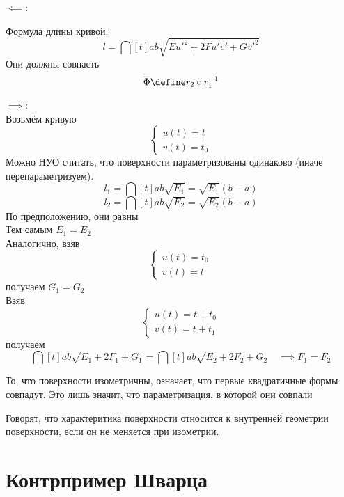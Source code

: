 \begin{iproof}
	\item $ \impliedby $:

	Формула длины кривой:
	$$ l = \dint[t]{a}b{\sqrt{Eu'^2 + 2Fu'v' + Gv'^2}} $$
	Они должны совпасть
	$$ \ol{\Phi} \define r_2 \circ r_1^{-1} $$
	\item $ \implies $: \\
	Возьмём кривую
	$$
	\begin{cases}
		u(t) = t \\
		v(t) = t_0
	\end{cases} $$
	Можно НУО считать, что поверхности параметризованы одинаково (иначе перепараметризуем).
	$$ l_1 = \dint[t]{a}b{\sqrt{E_1}} = \sqrt{E_1}(b - a) $$
	$$ l_2 = \dint[t]{a}b{\sqrt{E_2}} = \sqrt{E_2}(b - a) $$
	По предположению, они равны \\
	Тем самым $ E_1 = E_2 $ \\
	Аналогично, взяв
	$$
	\begin{cases}
		u(t) = t_0 \\
		v(t) = t
	\end{cases} $$
	получаем $ G_1 = G_2 $ \\
	Взяв
	$$
	\begin{cases}
		u(t) = t + t_0 \\
		v(t) = t + t_1
	\end{cases} $$
	получаем
	$$ \dint[t]{a}b{\sqrt{E_1 + 2F_1 + G_1}} = \dint[t]{a}b{\sqrt{E_2 + 2F_2 + G_2}} \quad \implies F_1 = F_2 $$
\end{iproof}

\begin{remark}
	То, что поверхности изометричны,  означает, что первые квадратичные формы совпадут. Это лишь значит, что  параметризация, в которой они совпали
\end{remark}

\begin{definition}
	Говорят, что характеритика поверхности относится к внутренней геометрии поверхности, если он не меняется при изометрии.
\end{definition}

\section{Контрпример Шварца}

